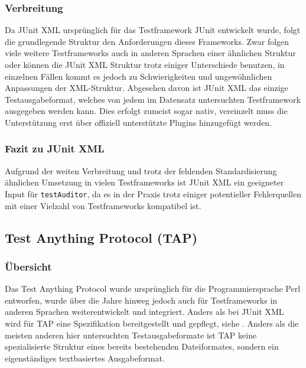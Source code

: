 \subsubsection{Verbreitung}
Da JUnit XML ursprünglich für das Testframework JUnit entwickelt wurde, folgt die grundlegende Struktur den Anforderungen dieses Frameworks. Zwar folgen viele weitere Testframeworks auch in anderen Sprachen einer ähnlichen Struktur oder können die JUnit XML Struktur trotz einiger Unterschiede benutzen, in einzelnen Fällen kommt es jedoch zu Schwierigkeiten und ungewöhnlichen Anpassungen der XML-Struktur.
Abgesehen davon ist JUnit XML das einzige Testausgabeformat, welches von jedem im Datensatz untersuchten Testframework ausgegeben werden kann. Dies erfolgt zumeist sogar nativ, vereinzelt muss die Unterstützung erst über offiziell unterstützte Plugins hinzugefügt werden. %


\subsubsection{Fazit zu JUnit XML}
Aufgrund der weiten Verbreitung und trotz der fehlenden Standardisierung ähnlichen Umsetzung in vielen Testframeworks ist JUnit XML ein geeigneter Input für \texttt{testAuditor}, da es in der Praxis trotz einiger potentieller Fehlerquellen mit einer Vielzahl von Testframeworks kompatibel ist.


\subsection{Test Anything Protocol (TAP)}
\subsubsection{Übersicht}
Das Test Anything Protocol wurde ursprünglich für die Programmiersprache Perl entworfen, wurde über die Jahre hinweg jedoch auch für Testframeworks in anderen Sprachen weiterentwickelt und integriert. Anders als bei JUnit XML wird für TAP eine Spezifikation bereitgestellt und gepflegt, siehe \cite{TAP_14}. Anders als die meisten anderen hier untersuchten Testausgabeformate ist TAP keine spezialisierte Struktur eines bereits bestehenden Dateiformates, sondern ein eigenständiges textbasiertes Ausgabeformat.

